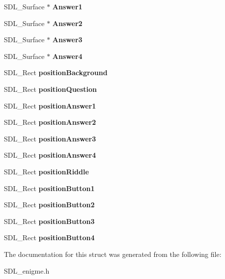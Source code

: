 \begin{DoxyCompactItemize}
S\+D\+L\+\_\+\+Surface $\ast$ {\bfseries Answer1}
\item 
\mbox{\label{structEnigme_aebba33339f08e1dff9c123458b91f1b3}} 
S\+D\+L\+\_\+\+Surface $\ast$ {\bfseries Answer2}
\item 
\mbox{\label{structEnigme_ac2ccc5b4f2e192238280426b6b2e60a5}} 
S\+D\+L\+\_\+\+Surface $\ast$ {\bfseries Answer3}
\item 
\mbox{\label{structEnigme_ab82f03b3ebf160afa884042d9981412a}} 
S\+D\+L\+\_\+\+Surface $\ast$ {\bfseries Answer4}
\item 
\mbox{\label{structEnigme_a1d459d9f8bc1a00e3dd51e9aabb478ec}} 
S\+D\+L\+\_\+\+Rect {\bfseries position\+Background}
\item 
\mbox{\label{structEnigme_ad1e0135d95f1a6f6ac47805c6b21e1e4}} 
S\+D\+L\+\_\+\+Rect {\bfseries position\+Question}
\item 
\mbox{\label{structEnigme_a5a9eb17fd4a5575868517c13ab5560e1}} 
S\+D\+L\+\_\+\+Rect {\bfseries position\+Answer1}
\item 
\mbox{\label{structEnigme_aa75583284f7f5997a2253a833309a6e1}} 
S\+D\+L\+\_\+\+Rect {\bfseries position\+Answer2}
\item 
\mbox{\label{structEnigme_a54321819d8085721a815e45dc1ba0686}} 
S\+D\+L\+\_\+\+Rect {\bfseries position\+Answer3}
\item 
\mbox{\label{structEnigme_a647f36c81658cf4a9d3d2caa8682c179}} 
S\+D\+L\+\_\+\+Rect {\bfseries position\+Answer4}
\item 
\mbox{\label{structEnigme_af7ce12ea7f83774a77950d58f07a4922}} 
S\+D\+L\+\_\+\+Rect {\bfseries position\+Riddle}
\item 
\mbox{\label{structEnigme_a915cc9358b4d14452966dcc170cb9b5a}} 
S\+D\+L\+\_\+\+Rect {\bfseries position\+Button1}
\item 
\mbox{\label{structEnigme_a0bd08bbd1877d4adb95fc1d64debc5df}} 
S\+D\+L\+\_\+\+Rect {\bfseries position\+Button2}
\item 
\mbox{\label{structEnigme_a62f844bf66f4821d9bb33bf45b847b25}} 
S\+D\+L\+\_\+\+Rect {\bfseries position\+Button3}
\item 
\mbox{\label{structEnigme_adcfb57288500a70f60ef989d46b65742}} 
S\+D\+L\+\_\+\+Rect {\bfseries position\+Button4}
\end{DoxyCompactItemize}


The documentation for this struct was generated from the following file\+:\begin{DoxyCompactItemize}
\item 
S\+D\+L\+\_\+enigme.\+h\end{DoxyCompactItemize}
